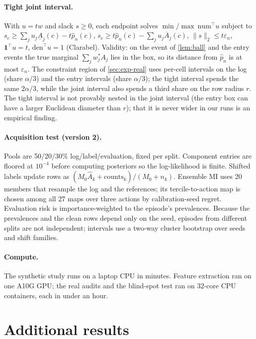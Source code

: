 \documentclass[twoside]{article}
\begin{document}
\paragraph{Tight joint interval.} With $u=tw$ and slack $s\ge0$, each endpoint solves
$\min/\max\ \text{num}^{\top}u$ subject to $s_c\ge\sum_ju_j\underline A_j(c)-t\hat p_n(c)$,
$s_c\ge t\hat p_n(c)-\sum_ju_j\overline A_j(c)$, $\lVert s\rVert_2\le t\varepsilon_n$, $\mathbf 1^{\top}u=t$,
$\text{den}^{\top}u=1$ (Clarabel). Validity: on the event of \cref{lem:ball} and the entry events the
true marginal $\sum_jw^{*}_jA_j$ lies in the box, so its distance from $\hat p_n$ is at most
$\varepsilon_n$. The constraint region of \cref{sec:exp-real} uses per-cell intervals on the log
(share $\alpha/3$) and the entry intervals (share $\alpha/3$); the tight interval spends the same $2\alpha/3$,
while the joint interval also spends a third share on the row radius $r$. The tight interval is not
provably nested in the joint interval (the entry box can have a larger Euclidean diameter than $r$); that it
is never wider in our runs is an empirical finding.

\paragraph{Acquisition test (version 2).} Pools are 50/20/30\% log/label/evaluation, fixed per split.
Component entries are floored at $10^{-4}$ before computing posteriors so the log-likelihood is
finite. Shifted labels update rows as $(M_0\hat A_k+\text{counts}_k)/(M_0+n_k)$. Ensemble MI uses 20
members that resample the log and the references; its tercile-to-action map is chosen among all 27 maps
over three actions by calibration-seed regret. Evaluation risk is importance-weighted to the episode's
prevalences. Because the prevalences and the clean rows depend only on the seed, episodes from
different splits are not independent; intervals use a two-way cluster bootstrap over seeds and shift
families.

\paragraph{Compute.} The synthetic study runs on a laptop CPU in minutes. Feature extraction ran on one
A10G GPU; the real audits and the blind-spot test ran on 32-core CPU containers, each in under an
hour.

\section{Additional results}
\label{app:extra}
\end{document}
